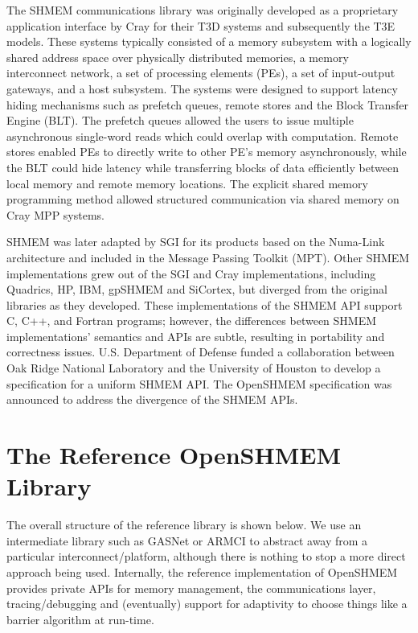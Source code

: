 \documentclass[english]{article}
\begin{document}
The SHMEM communications library was originally developed as a
proprietary application interface by Cray for their T3D systems and
subsequently the T3E models. These systems typically consisted of a
memory subsystem with a logically shared address space over physically
distributed memories, a memory interconnect network, a set of
processing elements (PEs), a set of input-output gateways, and a host
subsystem. The systems were designed to support latency hiding
mechanisms such as prefetch queues, remote stores and the Block
Transfer Engine (BLT). The prefetch queues allowed the users to issue
multiple asynchronous single-word reads which could overlap with
computation. Remote stores enabled PEs to directly write to other PE's
memory asynchronously, while the BLT could hide latency while
transferring blocks of data efficiently between local memory and
remote memory locations. The explicit shared memory programming method
allowed structured communication via shared memory on Cray MPP
systems.

SHMEM was later adapted by SGI for its products based on the Numa-Link
architecture and included in the Message Passing Toolkit (MPT). Other
SHMEM implementations grew out of the SGI and Cray implementations,
including Quadrics, HP, IBM, gpSHMEM and SiCortex, but diverged from
the original libraries as they developed. These implementations of the
SHMEM API support C, C++, and Fortran programs; however, the
differences between SHMEM implementations' semantics and APIs are
subtle, resulting in portability and correctness
issues. U.S. Department of Defense funded a collaboration between Oak
Ridge National Laboratory and the University of Houston to develop a
specification for a uniform SHMEM API. The OpenSHMEM specification was
announced to address the divergence of the SHMEM APIs.

\section{The Reference OpenSHMEM Library}

The overall structure of the reference library is shown below. We use
an intermediate library such as GASNet or ARMCI to abstract away from
a particular interconnect/platform, although there is nothing to stop
a more direct approach being used. Internally, the reference
implementation of OpenSHMEM provides private APIs for memory
management, the communications layer, tracing/debugging and
(eventually) support for adaptivity to choose things like a barrier
algorithm at run-time.
\end{document}
